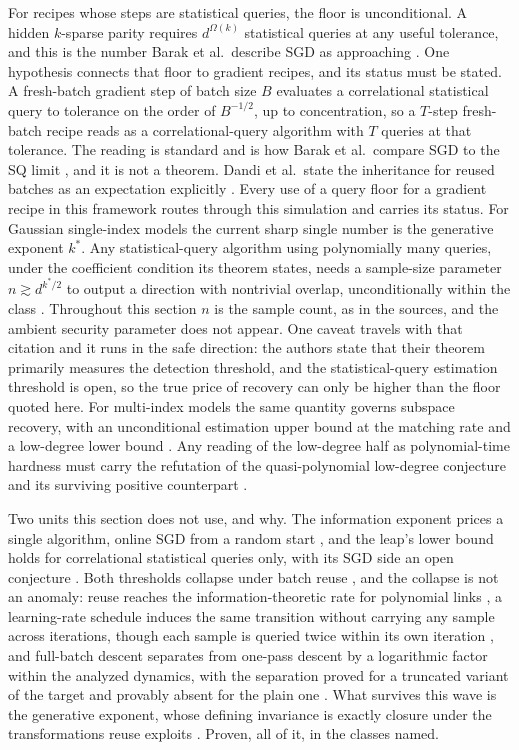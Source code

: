 For recipes whose steps are statistical queries, the floor is unconditional. A
hidden $k$-sparse parity requires $d^{\Omega(k)}$ statistical queries at any
useful tolerance, and this is the number Barak et al.\ describe SGD as
approaching \cite{BEGKMZ22}. One hypothesis connects that floor to gradient
recipes, and its status must be stated. A fresh-batch gradient step of batch size
$B$ evaluates a correlational statistical query to tolerance on the order of
$B^{-1/2}$, up to concentration, so a $T$-step fresh-batch recipe reads as a
correlational-query algorithm with $T$ queries at that tolerance. The reading is
standard and is how Barak et al.\ compare SGD to the SQ limit
\cite{BEGKMZ22}, and it is not a theorem. Dandi et al.\ state the inheritance
for reused batches as an expectation explicitly \cite{DTAPZK24}. Every use of a
query floor for a gradient recipe in this framework routes through this
simulation and carries its status. For Gaussian single-index models the current sharp
single number is the generative exponent $k^*$. Any statistical-query algorithm
using polynomially many queries, under the coefficient condition its theorem
states, needs a sample-size parameter $n \gtrsim d^{k^*/2}$ to output a
direction with nontrivial overlap, unconditionally within the class
\cite{DPLB24}. Throughout this section $n$ is the sample count, as in the
sources, and the ambient security parameter does not appear. One caveat travels with
that citation and it runs in the safe direction: the authors state that their
theorem primarily measures the detection threshold, and the statistical-query
estimation threshold is open, so the true price of recovery can only be higher
than the floor quoted here. For multi-index models the same quantity governs
subspace recovery, with an unconditional estimation upper bound at the matching
rate and a low-degree lower bound \cite{DLB25}. Any reading of the low-degree
half as polynomial-time hardness must carry the refutation of the
quasi-polynomial low-degree conjecture and its surviving positive counterpart
\cite{BHJK25,HKKLMT26}.

Two units this section does not use, and why. The information exponent prices a
single algorithm, online SGD from a random start \cite{AGJ21}, and the leap's
lower bound holds for correlational statistical queries only, with its SGD side
an open conjecture \cite{ABM23}. Both thresholds collapse under batch reuse
\cite{DTAPZK24}, and the collapse is not an anomaly: reuse reaches the
information-theoretic rate for polynomial links \cite{LOSW24}, a learning-rate
schedule induces the same transition without carrying any sample across
iterations, though each sample is queried twice within its own iteration
\cite{TME25}, and full-batch descent separates from one-pass descent by a logarithmic
factor within the analyzed dynamics, with the separation proved for a truncated
variant of the target and provably absent for the plain one \cite{KJWSM26}. What survives this wave is the generative exponent, whose
defining invariance is exactly closure under the transformations reuse exploits
\cite{DPLB24}. Proven, all of it, in the classes named.


